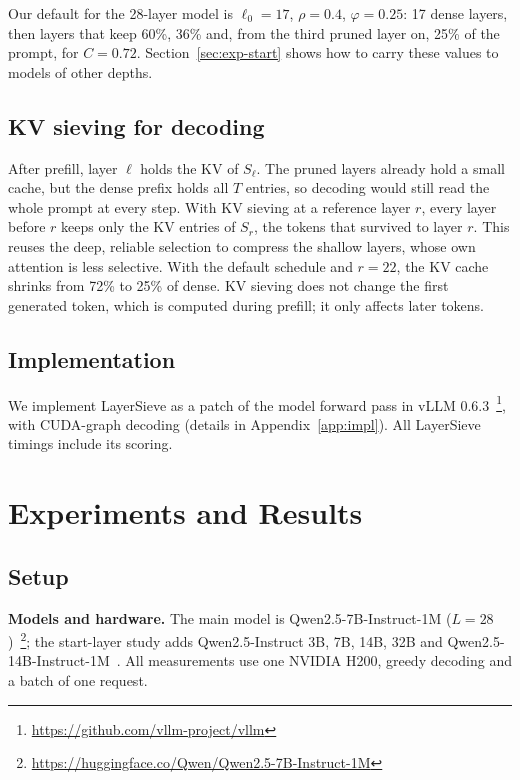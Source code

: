 \documentclass[10pt,conference]{IEEEtran}
\begin{document}
Our default for the 28-layer model is $\ell_0=17$, $\rho=0.4$, $\varphi=0.25$: 17 dense layers, then layers that keep 60\%, 36\% and, from the third pruned layer on, 25\% of the prompt, for $C=0.72$. Section~\ref{sec:exp-start} shows how to carry these values to models of other depths.

\subsection{KV sieving for decoding}

After prefill, layer $\ell$ holds the KV of $S_\ell$. The pruned layers already hold a small cache, but the dense prefix holds all $T$ entries, so decoding would still read the whole prompt at every step. With KV sieving at a reference layer $r$, every layer before $r$ keeps only the KV entries of $S_r$, the tokens that survived to layer $r$. This reuses the deep, reliable selection to compress the shallow layers, whose own attention is less selective. With the default schedule and $r=22$, the KV cache shrinks from 72\% to 25\% of dense. KV sieving does not change the first generated token, which is computed during prefill; it only affects later tokens.


\subsection{Implementation}

We implement LayerSieve as a patch of the model forward pass in vLLM 0.6.3~\cite{kwon2023efficient}\footnote{\url{https://github.com/vllm-project/vllm}}, with CUDA-graph decoding (details in Appendix~\ref{app:impl}). All LayerSieve timings include its scoring.

\section{Experiments and Results}
\label{sec:exp}

\subsection{Setup}
\label{sec:setup}

\textbf{Models and hardware.} The main model is Qwen2.5-7B-Instruct-1M ($L=28$)~\cite{qwen25_1m}\footnote{\url{https://huggingface.co/Qwen/Qwen2.5-7B-Instruct-1M}}; the start-layer study adds Qwen2.5-Instruct 3B, 7B, 14B, 32B and Qwen2.5-14B-Instruct-1M~\cite{qwen252024}. All measurements use one NVIDIA H200, greedy decoding and a batch of one request.
\end{document}
